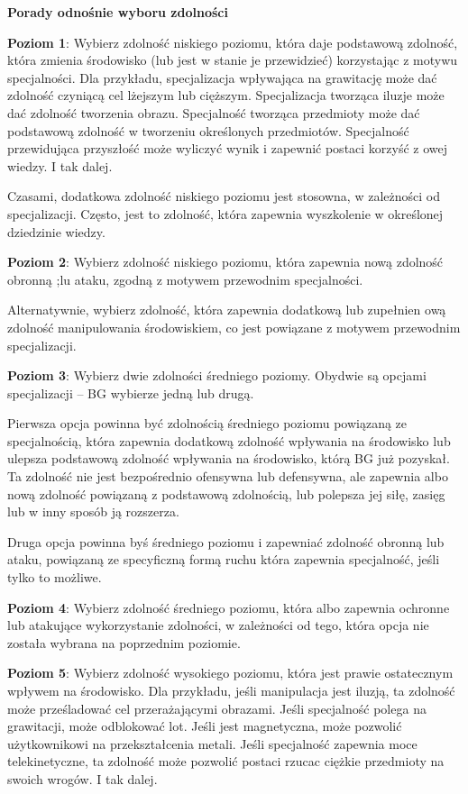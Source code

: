 \textbf{Porady odnośnie wyboru zdolności}

\textbf{Poziom 1}: Wybierz zdolność niskiego poziomu, która daje podstawową zdolność, która zmienia środowisko (lub jest w stanie je przewidzieć) korzystając z motywu specjalności. Dla przykładu, specjalizacja wpływająca na grawitację może dać zdolność czyniącą cel lżejszym lub cięższym. Specjalizacja tworząca iluzje może dać zdolność tworzenia obrazu. Specjalność tworząca przedmioty może dać podstawową  zdolność w tworzeniu określonych przedmiotów. Specjalność przewidująca przyszłość może wyliczyć wynik i zapewnić postaci korzyść z owej wiedzy. I tak dalej.

Czasami, dodatkowa zdolność niskiego poziomu jest stosowna, w zależności od specjalizacji. Często, jest to zdolność, która zapewnia wyszkolenie w określonej dziedzinie wiedzy.

\textbf{Poziom 2}: Wybierz zdolność niskiego poziomu, która zapewnia nową zdolność obronną ;lu ataku, zgodną z motywem przewodnim specjalności. 

Alternatywnie, wybierz zdolność, która zapewnia dodatkową lub zupełnien ową zdolność manipulowania środowiskiem, co jest powiązane z motywem przewodnim specjalizacji.

\textbf{Poziom 3}: Wybierz dwie zdolności średniego poziomy. Obydwie są opcjami specjalizacji – BG wybierze jedną lub drugą.

Pierwsza opcja powinna być zdolnością średniego poziomu powiązaną ze specjalnością, która zapewnia dodatkową zdolność wpływania na środowisko lub ulepsza podstawową zdolność wpływania na środowisko, którą BG już pozyskał. Ta zdolność nie jest bezpośrednio ofensywna lub defensywna, ale zapewnia albo nową zdolność powiązaną z podstawową zdolnością, lub polepsza jej siłę, zasięg lub w inny sposób ją rozszerza. 

Druga opcja powinna byś średniego poziomu i zapewniać zdolność obronną lub ataku, powiązaną ze specyficzną formą ruchu która zapewnia specjalność, jeśli tylko to możliwe.

\textbf{Poziom 4}: Wybierz zdolność średniego poziomu, która albo zapewnia ochronne lub atakujące wykorzystanie zdolności, w zależności od tego, która opcja nie została wybrana na poprzednim poziomie. 

\textbf{Poziom 5}: Wybierz zdolność wysokiego poziomu, która jest prawie ostatecznym wpływem na środowisko. Dla przykładu, jeśli manipulacja jest iluzją, ta zdolność może prześladować cel przerażającymi obrazami. Jeśli specjalność polega na grawitacji, może odblokować lot. Jeśli jest magnetyczna, może pozwolić użytkownikowi na przekształcenia metali. Jeśli specjalność zapewnia moce telekinetyczne, ta zdolność może pozwolić postaci rzucac ciężkie przedmioty na swoich wrogów. I tak dalej.

